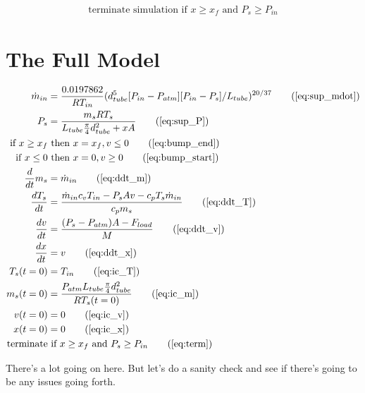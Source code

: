 \documentclass[10pt,letterpaper]{article}
\begin{document}
	\begin{align} \label{eq:term}
		\mbox{terminate simulation if } x \geq x_f \mbox{ and } P_s \geq P_{in}
	\end{align}
	
	\section*{The Full Model}
	
	\begin{align}
		\dot{m}_{in} &= \frac{0.0197862}{R T_{in}} (d_{tube}^5 [P_{in}-P_{atm}] [P_{in}-P_{s}]/L_{tube})^{20/37} \tag{\ref{eq:sup_mdot}} \\
		P_s &= \frac{m_s R T_s}{L_{tube} \frac{\pi}{4} d_{tube}^2 + x A} \tag{\ref{eq:sup_P}} \\			
		\mbox{if } x \geq x_f &\mbox{ then } x = x_f, v \leq 0 \tag{\ref{eq:bump_end}} \\
		\mbox{if } x \leq 0   &\mbox{ then } x = 0, v \geq 0 \tag{\ref{eq:bump_start}} \\
		\frac{d}{dt} m_s &= \dot{m}_{in} \tag{\ref{eq:ddt_m}} \\
		\frac{d T_s}{dt} &= \frac{ \dot{m}_{in} c_v T_{in} - P_s A v - c_p T_s \dot{m}_{in} }{c_p m_s} \tag{\ref{eq:ddt_T}} \\
		\frac{dv}{dt} &= \frac{(P_s - P_{atm}) A - F_{load}}{M} \tag{\ref{eq:ddt_v}} \\
		\frac{dx}{dt} &= v \tag{\ref{eq:ddt_x}} \\
		T_s(t=0)& = T_{in} \tag{\ref{eq:ic_T}} \\
		m_s(t=0) &= \frac{P_{atm} L_{tube} \frac{\pi}{4} d_{tube}^2}{R T_s(t=0)} \tag{\ref{eq:ic_m}} \\
		v(t=0) &= 0 \tag{\ref{eq:ic_v}} \\
		x(t=0) &= 0 \tag{\ref{eq:ic_x}} \\
		\mbox{terminate}& \mbox{ if } x \geq x_f \mbox{ and } P_s \geq P_{in} \tag{\ref{eq:term}}
	\end{align}
	
	There's a lot going on here. But let's do a sanity check and see if there's going to be any issues going forth.
	
\end{document}
